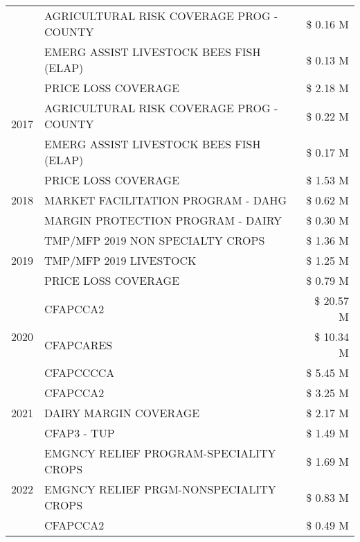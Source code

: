\begin{tabular}{llr}
 & AGRICULTURAL RISK COVERAGE PROG - COUNTY & \$ 0.16 M \\
 & EMERG ASSIST LIVESTOCK BEES FISH (ELAP) & \$ 0.13 M \\
\cline{1-3}
\multirow[t]{3}{*}{2017} & PRICE LOSS COVERAGE & \$ 2.18 M \\
 & AGRICULTURAL RISK COVERAGE PROG - COUNTY & \$ 0.22 M \\
 & EMERG ASSIST LIVESTOCK BEES FISH (ELAP) & \$ 0.17 M \\
\cline{1-3}
\multirow[t]{3}{*}{2018} & PRICE LOSS COVERAGE & \$ 1.53 M \\
 & MARKET FACILITATION PROGRAM - DAHG & \$ 0.62 M \\
 & MARGIN PROTECTION PROGRAM - DAIRY & \$ 0.30 M \\
\cline{1-3}
\multirow[t]{3}{*}{2019} & TMP/MFP 2019 NON SPECIALTY CROPS & \$ 1.36 M \\
 & TMP/MFP 2019 LIVESTOCK & \$ 1.25 M \\
 & PRICE LOSS COVERAGE & \$ 0.79 M \\
\cline{1-3}
\multirow[t]{3}{*}{2020} & CFAPCCA2 & \$ 20.57 M \\
 & CFAPCARES & \$ 10.34 M \\
 & CFAPCCCCA & \$ 5.45 M \\
\cline{1-3}
\multirow[t]{3}{*}{2021} & CFAPCCA2 & \$ 3.25 M \\
 & DAIRY MARGIN COVERAGE & \$ 2.17 M \\
 & CFAP3 - TUP & \$ 1.49 M \\
\cline{1-3}
\multirow[t]{3}{*}{2022} & EMGNCY RELIEF PROGRAM-SPECIALITY CROPS & \$ 1.69 M \\
 & EMGNCY RELIEF PRGM-NONSPECIALITY CROPS & \$ 0.83 M \\
 & CFAPCCA2 & \$ 0.49 M \\
\cline{1-3}
\bottomrule
\end{tabular}
